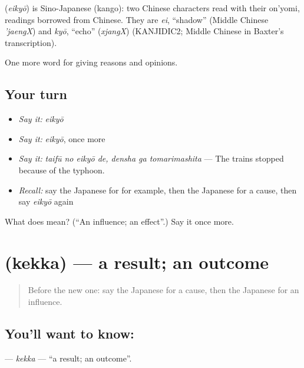 \begin{cousinweb}
\textbf{} (\emph{eikyō}) is Sino-Japanese (kango): two Chinese characters read with their on'yomi, readings borrowed from Chinese. They are \emph{ei}, \textquotedblleft{}shadow\textquotedblright{} (Middle Chinese \emph{'jaengX}) and \emph{kyō}, \textquotedblleft{}echo\textquotedblright{} (\emph{xjangX}) (KANJIDIC2; Middle Chinese in Baxter's transcription).
\end{cousinweb}

\begin{grammarlens}[title={What you've built}]
One more word for giving reasons and opinions.
\end{grammarlens}

\subsection*{Your turn}
\begin{itemize}
\raggedright
  \item \emph{Say it:} \emph{eikyō}
  \item \emph{Say it:} \emph{eikyō}, once more
  \item \emph{Say it:} \emph{taifū no eikyō de, densha ga tomarimashita} — The trains stopped because of the typhoon.
  \item \emph{Recall:} say the Japanese for for example, then the Japanese for a cause, then say \emph{eikyō} again
\end{itemize}

\begin{tcolorbox}[breakable,colback=teal!4,colframe=teal!35!black,title={Before you move on}]
What does  mean? (\textquotedblleft{}An influence; an effect\textquotedblright{}.) Say it once more.
\end{tcolorbox}
\section[\texorpdfstring{\ja{けっか} (kekka)}{けっか (kekka)}]{ (kekka) — a result; an outcome}

\label{lesson:JA-C342-kekka}



\begin{quote}
Before the new one: say the Japanese for a cause, then the Japanese for an influence.
\end{quote}

\subsection*{You'll want to know: }
\textbf{} — \emph{kekka} — \textquotedblleft{}a result; an outcome\textquotedblright{}.

